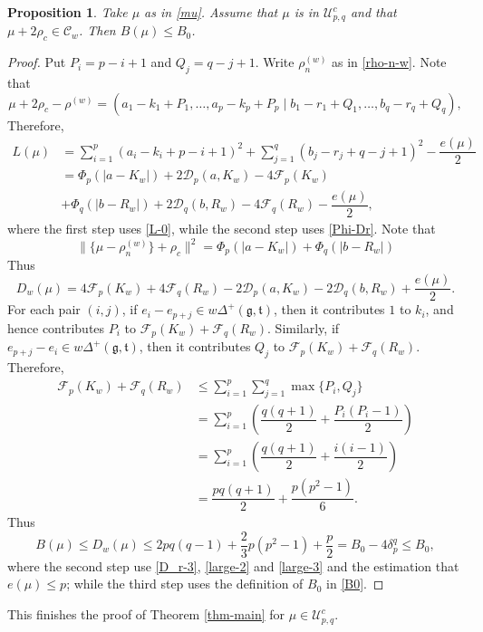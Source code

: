 \documentclass[11pt]{amsart}
\theoremstyle{plain}
\newtheorem{prop}[thm]{Proposition}
\theoremstyle{definition}
\newcommand{\frg}{\mathfrak{g}}
\newcommand{\frt}{\mathfrak{t}}
\newcommand{\caC}{\mathcal{C}}
\newcommand{\caD}{\mathcal{D}}
\newcommand{\caF}{\mathcal{F}}
\newcommand{\caU}{\mathcal{U}}
\begin{document}
\begin{prop}
	Take $\mu$ as in \eqref{mu}.	Assume that  $\mu$ is in $\caU_{p, q}^c$ and that $\mu+2\rho_c\in\caC_w$. Then $B(\mu)\le B_0$.
\end{prop}
\begin{proof}
	Put $P_i=p-i+1$ and $Q_j=q-j+1$. 	Write  $\rho_n^{(w)}$ as in \eqref{rho-n-w}. Note that
	\[\mu+2\rho_c-\rho^{(w)}=(a_1-k_1+P_1,\dots,a_p-k_p+P_p\mid b_1-r_1+Q_1,\dots,b_q-r_q+Q_q),\]
Therefore,
	\begin{align*}
L(\mu) &= \sum_{i=1}^p(a_i-k_i+p-i+1)^2+\sum_{j=1}^q(b_j-r_j+q-j+1)^2-\dfrac{e(\mu)}{2}\\
&= \Phi_p(|a-K_w|) + 2\caD_p(a,K_w) - 4 \caF_p(K_w)\\
&+ \Phi_q(|b-R_w|)+ 2\caD_q(b,R_w) - 4\caF_q(R_w)-\dfrac{e(\mu)}{2},
\end{align*}
where the first step uses \eqref{L-0}, while the second step uses \eqref{Phi-Dr}.
Note that
$$
\|\{\mu-\rho_n^{(w)}\} +\rho_c\|^2= \Phi_p(|a-K_w|) + \Phi_q(|b-R_w|)
$$
Thus
\begin{equation}\label{large-2}
		D_w(\mu)=4\caF_p(K_w)+4\caF_q(R_w)-2\caD_p(a,K_w)-2\caD_q(b,R_w)+\dfrac{e(\mu)}{2}.
	\end{equation}
	For each pair $(i, j)$, if $e_i-e_{p+j}\in w\Delta^+(\frg,\frt)$, then it contributes $1$ to $k_i$, and hence contributes $P_i$ to $\caF_p(K_w)+\caF_q(R_w)$. Similarly, if $e_{p+j}-e_i\in w\Delta^+(\frg,\frt)$, then it contributes $Q_j$ to $\caF_p(K_w)+\caF_q(R_w)$. Therefore,
	\begin{align}\label{large-3}
		\caF_p(K_w)+\caF_q(R_w)&\le \sum_{i=1}^p\sum_{j=1}^q\max\{P_i,Q_j\}\nonumber\\
		&=\sum_{i=1}^p\left(\dfrac{q(q+1)}{2}+\dfrac{P_i(P_i-1)}{2}\right)\nonumber\\
        &=\sum_{i=1}^p\left(\dfrac{q(q+1)}{2}+\dfrac{i(i-1)}{2}\right)\nonumber\\
		&=\dfrac{pq(q+1)}{2}+\dfrac{p(p^2-1)}{6}.
	\end{align}
Thus
	\[B(\mu)\le D_w(\mu)\le 2pq(q-1)+\frac{2}{3} p(p^2-1)+\frac{p}{2}=B_0-4\delta_p^q\le B_0,\]
where the second step use \eqref{D_r-3}, \eqref{large-2} and \eqref{large-3} and the estimation that $e(\mu)\le p$; while the third step uses the definition of $B_0$ in \eqref{B0}.
\end{proof}

This finishes the proof of Theorem \ref{thm-main} for $\mu\in\caU_{p, q}^c$.

\medskip
\end{document}
